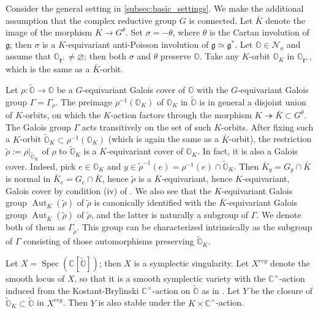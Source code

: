 \documentclass[11pt, a4paper]{amsart}
\newcommand{\C}{\mathbb{C}}
\newcommand{\g}{\mathfrak{g}}
\newcommand{\orb}{\mathbb{O}}
\newcommand{\orbk}{\orb_{K}}
\newcommand{\torbk}{\widetilde{\orb}_{K}}
\newcommand{\fk}{\mathfrak{k}}
\newcommand{\cN}{\mathcal{N}}
\DeclareMathOperator{\Aut}{Aut}
\newcommand{\cm}{\C^\times}
\newcommand{\spec}{\operatorname{Spec}}
\theoremstyle{definition}
\numberwithin{equation}{section}
\begin{document}
Consider the general setting in \cref{subsec:basic_settings}. We make the additional assumption that the complex reductive group $G$ is connected. Let $\bar{K}$ denote the image of the morphism $K \to G^\theta$.
Set $\sigma = -\theta$, where $\theta$ is the Cartan involution of $\g$; then $\sigma$ is a $K$-equivariant anti-Poisson involution of $\g \simeq \g^*$. Let $\orb \in \cN_o$ and assume that $\orb_{\fk^\perp} \neq \varnothing$; then both $\sigma$ and $\theta$ preserve $\orb$. Take any $K$-orbit $\orbk$ in $\orb_{\fk^\perp}$, which is the same as a $\bar{K}$-orbit. 

Let $\rho: \widetilde{\orb} \to \orb$ be a $G$-equivariant Galois cover of $\orb$ with the $G$-equivariant Galois group $\Gamma = \Gamma_{\rho}$. The preimage $\rho^{-1}(\orbk)$ of $\orbk$ in $\widetilde{\orb}$ is in general a disjoint union of $K$-orbits, on which the $K$-action factors through the morphism $K \twoheadrightarrow \bar{K} \subset G^\theta$. The Galois group $\Gamma$ acts transitively on the set of such $K$-orbits. After fixing such a $K$-orbit $\torbk \subset \rho^{-1}(\orbk)$ (which is again the same as a $\bar{K}$-orbit), the restriction 
$\tilde{\rho} := \rho|_{\torbk}$
of $\rho$ to $\torbk$ is a $K$-equivariant cover of $\orbk$. In fact, it is also a Galois cover. Indeed, pick $e \in \orbk$ and $y \in \tilde{\rho}^{-1}(e) = \rho^{-1}(e) \cap \torbk$. Then $\bar{K}_y = G_y \cap \bar{K}$ is normal in $\bar{K}_e = G_e \cap \bar{K}$, hence $\tilde{\rho}$ is a $\bar{K}$-equivariant, hence $K$-equivariant, Galois cover by condition (iv) of . We also see that the $K$-equivariant Galois group $\Aut_K(\tilde{\rho})$ of $\tilde{\rho}$ is canonically identified with the $\bar{K}$-equivariant Galois group $\Aut_{\bar{K}}(\tilde{\rho})$ of $\tilde{\rho}$, and the latter is naturally a subgroup of $\Gamma$. We denote both of them as $\Gamma_{\tilde{\rho}}$. This group can be characterized intrinsically as the subgroup of $\Gamma$ consisting of those automorphisms preserving $\torbk$.  

Let $X = \spec(\C[\widetilde{\orb}])$; then $X$ is a symplectic singularity. Let $X^{reg}$ denote the smooth locus of $X$, so that it is a smooth symplectic variety with the $\cm$-action induced from the Kostant-Brylinski $\cm$-action on $\widetilde{\orb}$ as in . Let $Y$ be the closure of $\torbk \subset \widetilde{\orb}$ in $X^{reg}$. Then $Y$ is also stable under the $K \times \cm$-action.
\end{document}
